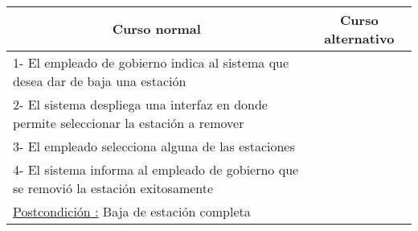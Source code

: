 ~


\begin{center}
    \centering
    \begin{tabular}{ | p{11cm} | p{6cm} | }
        \multicolumn{1}{c}{\cellcolor{black!30}\textbf{Curso normal}} & 
        \multicolumn{1}{c}{\cellcolor{black!30}\textbf{Curso alternativo}} \\ \hline
        1- El empleado de gobierno indica al sistema que desea dar de baja una estación & \\ \hline
        2- El sistema despliega una interfaz en donde permite seleccionar la estación a remover& \\ \hline
        3- El empleado selecciona alguna de las estaciones & \\ \hline
        4- El sistema informa al empleado de gobierno que se removió la estación exitosamente & \\ \hline
        \underline{Postcondición :} Baja de estación completa & \\ \hline
    \end{tabular}
\end{center}




